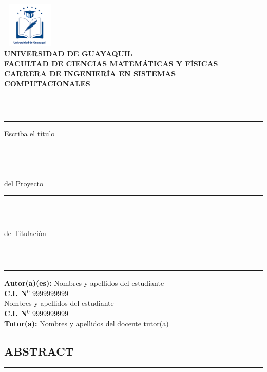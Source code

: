 \documentclass[12pt, a4paper, nofontenc, numbers=endperiod]{apa7}
\begin{document}
		{ %
			\begin{center}	
				\includegraphics[width=2.65cm,height=2.17cm]{Imagenes/Figura1}	\\  [0.5cm]
				\textbf{ UNIVERSIDAD DE GUAYAQUIL} \\[-0.1cm]
				\textbf{ FACULTAD DE CIENCIAS MATEMÁTICAS Y FÍSICAS} \\ [-0.1cm]
				\textbf{ CARRERA DE INGENIERÍA EN SISTEMAS COMPUTACIONALES} \\ [0.5cm]
				\footnotesize
				\rule[1mm]{90mm}{0.1mm} \\
				\rule[1mm]{20mm}{0.1mm}  Escriba el título \rule[1mm]{20mm}{0.1mm}\\
				\rule[1mm]{15mm}{0.1mm}  del Proyecto \rule[1mm]{15mm}{0.1mm}\\
				\rule[1mm]{7mm}{0.1mm}  de Titulación \rule[1mm]{7mm}{0.1mm}\\
				\rule[1mm]{20mm}{0.1mm}
			\end{center}
			\begin{flushright}
				\begin{minipage}[b]{9.5cm}
					\singlespacing \hspace*{1.1cm} \textbf{Autor(a)(es):} Nombres y apellidos del estudiante\\
					\hspace*{6cm}\textbf{C.I. N$^{0}$ }9999999999\\
					\hspace*{3.4cm} {\color{red}Nombres y apellidos del estudiante}\\ 
					\hspace*{6cm}\textbf{{\color{red}C.I. N$^{0}$}} {\color{red}9999999999}\\ [0.5cm]
					\hspace*{0.8cm}\textbf{Tutor(a):} Nombres y apellidos del docente tutor(a)	
				\end{minipage}	
			\end{flushright}
			\vspace*{-1cm}
			\begin{center}
				\section*{\large \centering ABSTRACT}
				\rule[9mm]{159mm}{0.1mm} 
			\end{center}
			\vspace*{-1.8cm}
			
}
\end{document}
